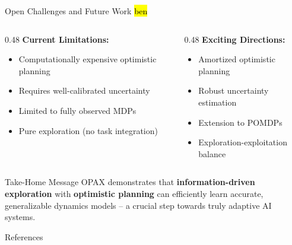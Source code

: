 \documentclass[11pt,aspectratio=169]{beamer}
\begin{document}
\begin{frame}{Open Challenges and Future Work \hl{ben}}
    \begin{columns}[T]
        \begin{column}{0.48\textwidth}
            \textbf{Current Limitations:}
            \begin{itemize}
                \item Computationally expensive optimistic planning
                \item Requires well-calibrated uncertainty
                \item Limited to fully observed MDPs
                \item Pure exploration (no task integration)
            \end{itemize}
        \end{column}
        \begin{column}{0.48\textwidth}
            \textbf{Exciting Directions:}
            \begin{itemize}
                \item Amortized optimistic planning
                \item Robust uncertainty estimation
                \item Extension to POMDPs
                \item Exploration-exploitation balance
            \end{itemize}
        \end{column}
    \end{columns}
    
    \vspace{0.5em}
    \begin{alertblock}{Take-Home Message}
        OPAX demonstrates that \textbf{information-driven exploration} with \textbf{optimistic planning} can efficiently learn accurate, generalizable dynamics models – a crucial step towards truly adaptive AI systems.
    \end{alertblock}
\end{frame}

\begin{frame}[allowframebreaks]{References} %
    \printbibliography
\end{frame}
\end{document}
